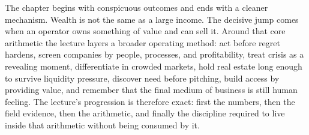 The chapter begins with conspicuous outcomes and ends with a cleaner mechanism. Wealth is not the same as a large income. The decisive jump comes when an operator owns something of value and can sell it. Around that core arithmetic the lecture layers a broader operating method: act before regret hardens, screen companies by people, processes, and profitability, treat crisis as a revealing moment, differentiate in crowded markets, hold real estate long enough to survive liquidity pressure, discover need before pitching, build access by providing value, and remember that the final medium of business is still human feeling. The lecture's progression is therefore exact: first the numbers, then the field evidence, then the arithmetic, and finally the discipline required to live inside that arithmetic without being consumed by it.